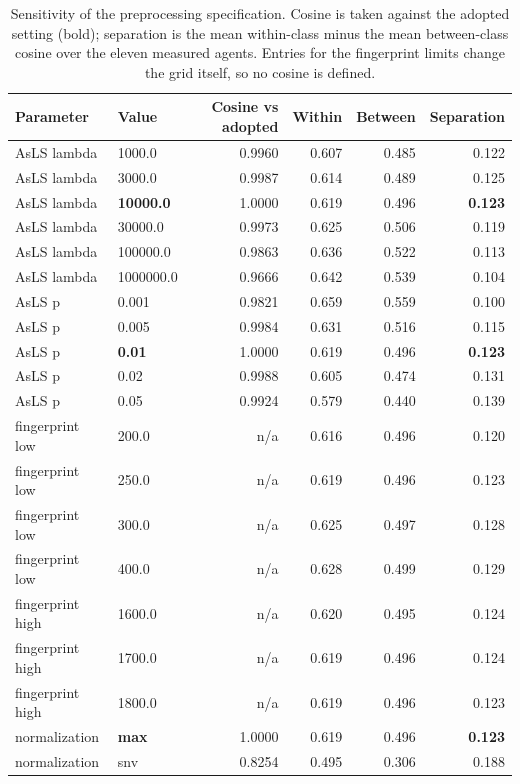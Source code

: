\documentclass[11pt]{article}
\begin{document}
\begin{table}[htbp]
\centering
\caption{Sensitivity of the preprocessing specification. Cosine is taken against the adopted setting (bold); separation is the mean within-class minus the mean between-class cosine over the eleven measured agents. Entries for the fingerprint limits change the grid itself, so no cosine is defined.}
\label{tab:si-preproc}
\small
\begin{tabular}{llrrrr}
\toprule
Parameter & Value & Cosine vs adopted & Within & Between & Separation \\
\midrule
AsLS lambda & 1000.0 & 0.9960 & 0.607 & 0.485 & 0.122 \\
AsLS lambda & 3000.0 & 0.9987 & 0.614 & 0.489 & 0.125 \\
AsLS lambda & \textbf{10000.0} & 1.0000 & 0.619 & 0.496 & \textbf{0.123} \\
AsLS lambda & 30000.0 & 0.9973 & 0.625 & 0.506 & 0.119 \\
AsLS lambda & 100000.0 & 0.9863 & 0.636 & 0.522 & 0.113 \\
AsLS lambda & 1000000.0 & 0.9666 & 0.642 & 0.539 & 0.104 \\
AsLS p & 0.001 & 0.9821 & 0.659 & 0.559 & 0.100 \\
AsLS p & 0.005 & 0.9984 & 0.631 & 0.516 & 0.115 \\
AsLS p & \textbf{0.01} & 1.0000 & 0.619 & 0.496 & \textbf{0.123} \\
AsLS p & 0.02 & 0.9988 & 0.605 & 0.474 & 0.131 \\
AsLS p & 0.05 & 0.9924 & 0.579 & 0.440 & 0.139 \\
fingerprint low & 200.0 & n/a & 0.616 & 0.496 & 0.120 \\
fingerprint low & 250.0 & n/a & 0.619 & 0.496 & 0.123 \\
fingerprint low & 300.0 & n/a & 0.625 & 0.497 & 0.128 \\
fingerprint low & 400.0 & n/a & 0.628 & 0.499 & 0.129 \\
fingerprint high & 1600.0 & n/a & 0.620 & 0.495 & 0.124 \\
fingerprint high & 1700.0 & n/a & 0.619 & 0.496 & 0.124 \\
fingerprint high & 1800.0 & n/a & 0.619 & 0.496 & 0.123 \\
normalization & \textbf{max} & 1.0000 & 0.619 & 0.496 & \textbf{0.123} \\
normalization & snv & 0.8254 & 0.495 & 0.306 & 0.188 \\
\bottomrule
\end{tabular}


\end{table}
\end{document}
